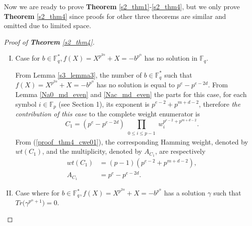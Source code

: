 \documentclass[final,1p,times]{elsarticle}
\begin{document}
Now we are ready to prove \textbf{Theorem} \ref{s2_thm1}-\ref{s2_thm4}, but we only prove \textbf{Theorem} \ref{s2_thm4} since proofs for other three theorems are similar and omitted due to limited space.
\begin{proof}[Proof of \textbf{Theorem} \ref{s2_thm4}]
\begin{enumerate}[(I)]
\item Case for $ b\in \mathbb{F}_{q}^{*}, f(X)=X^{p^{2\alpha}} +X=- b^{p^{\alpha}} $ has no solution in $ \mathbb{F}_{q} $.

From Lemma \ref{s3_lemma3}, the number of $  b\in \mathbb{F}_{q}^{*} $ such that $ f(X)=X^{p^{2\alpha}} +X=- b^{p^{\alpha}} $ has no solution is equal to $ p^{e}-p^{e-2d} $. From Lemma \ref{Na0_md_even} and \ref{Nac_md_even} the parts for this case, for each symbol $ i\in \mathbb{F}_{p} $ (see Section 1), its exponent is $ p^{e-2}+p^{m+d-2} $, therefore \textit{the contribution of this case} to the complete weight enumerator is
\begin{equation}\label{proof_thm4_cwe01}
C_{1}=(p^{e}-p^{e-2d})\prod_{\substack{0\leq i\leq p-1}}w_{i}^{p^{e-2}+p^{m+d-2}}.
\end{equation}
From (\ref{proof_thm4_cwe01}), the corresponding Hamming weight, denoted by $ wt(C_{1}) $, and the multiplicity, denoted by $ A_{C_{1}} $, are respectively
\begin{equation}\label{proof_thm4_hamming01}
\begin{split}
wt(C_{1})&=(p-1) (p^{e-2}+p^{m+d-2}),\\
A_{C_{1}}&=p^{e}-p^{e-2d}.
\end{split}
\end{equation}
\item Case where for $ b\in \mathbb{F}_{q}^{*}, f(X)=X^{p^{2\alpha}} +X=- b^{p^{\alpha}} $ has a solution $ \gamma $ such that $ Tr\bigl(\gamma^{p^{\alpha}+1}\bigr)=0 $.


\end{enumerate}
\end{proof}
\end{document}
